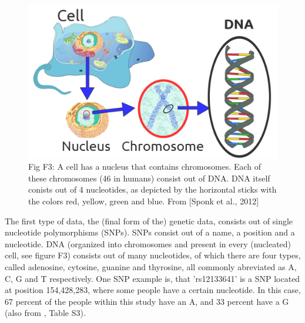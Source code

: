 \begin{figure}[!htbp]
  \centering
  \includegraphics[width=\linewidth]{1189px-Eukaryote_DNA-en.png}
  \caption{
    Fig F3: A cell has a nucleus that contains chromosomes. 
    Each of these chromosomes (46 in humans) consist out of DNA. 
    DNA itself conists out of 4 nucleotides, 
    as depicted by the horizontal sticks 
    with the colors red, yellow, green and blue.
    From [Sponk et al., 2012]
  }
  \label{fig:eukakyote_dna}
\end{figure}

The first type of data, the (final form of the) genetic data,
consists out of single nucleotide polymorphisms (SNPs).
SNPs consist out of a name, a position and a nucleotide. 
DNA (organized into chromosomes and present in every (nucleated) cell, 
see figure F3) consists out of many nucleotides, of which there are four types,
called adenosine, cytosine, guanine and thyrosine, all commonly abreviated
as A, C, G and T respectively.
One SNP example is, that 'rs12133641' is a SNP located at position 154,428,283,
where some people have a certain nucleotide. In this case, 
67 percent of the people within this study have an A,
and 33 percent have a G (also from \cite{ahsan2017relative}, Table S3).

